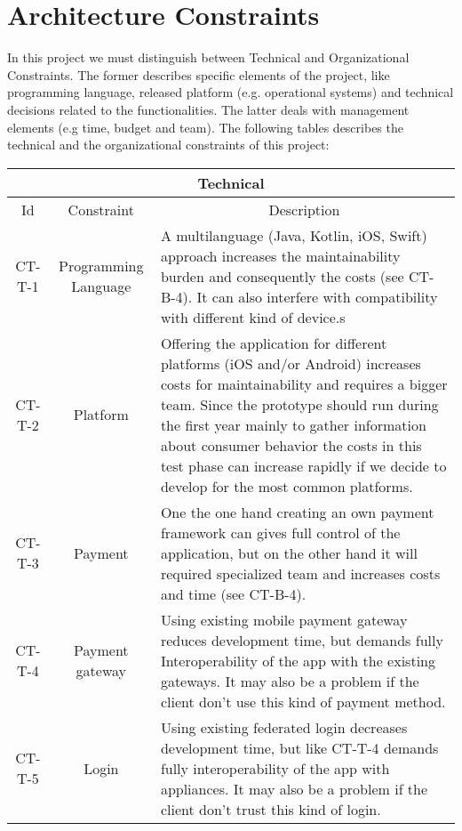 \section{Architecture Constraints}

In this project we must distinguish between Technical and Organizational Constraints. The former describes specific elements
of the project, like programming language, released platform (e.g. operational systems) and technical decisions related to 
the functionalities. The latter deals with management elements\cite{refonline:EFAD} (e.g time, budget and team). The following
tables describes the technical and the organizational constraints of this project: 

\begin{table}[H]
    \begin{tabularx}{\textwidth}{|c|c|X|}
        \hline
        \multicolumn{3}{c}{\textbf{Technical}} \\
        \hline
        \toprule
        \multicolumn{1}{c}{Id} & \multicolumn{1}{c}{Constraint} & \multicolumn{1}{c}{Description} \\
        \midrule
        CT-T-1 & Programming Language & A multilanguage (Java, Kotlin, iOS, Swift) approach increases
        the maintainability burden and consequently the costs (see CT-B-4). It can also interfere with
        compatibility with different kind of device.s  \\ 
        CT-T-2 & Platform & Offering the application for different platforms (iOS and/or Android) increases
        costs for maintainability and requires a bigger team. Since the prototype should run during the
        first year mainly to gather information about consumer behavior the costs in this test phase can
        increase rapidly if we decide to develop for the most common platforms. \\ 
        CT-T-3 & Payment & One the one hand creating an own payment framework can gives full control of the application,
        but on the other hand it will required specialized team and increases costs and time (see CT-B-4). \\
        CT-T-4 & Payment gateway & Using existing \gls{mobile payment gateway} reduces development time, but demands
        fully Interoperability of the app with the existing gateways. It may also be a problem if the \gls{client}
        don't use this kind of payment method. \\
        CT-T-5 & Login & Using existing \gls{federated login} decreases development time, but like CT-T-4 demands
        fully interoperability of the app with appliances. It may also be a problem if the \gls{client}
        don't trust this kind of login. \\
        \bottomrule
    \end{tabularx}
\end{table}

